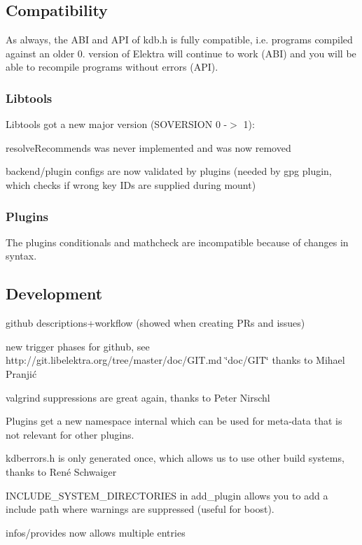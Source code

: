 \subsection*{Compatibility}

As always, the A\+B\+I and A\+P\+I of kdb.\+h is fully compatible, i.\+e. programs compiled against an older 0. version of Elektra will continue to work (A\+B\+I) and you will be able to recompile programs without errors (A\+P\+I).

\subsubsection*{Libtools}

Libtools got a new major version (S\+O\+V\+E\+R\+S\+I\+O\+N 0 -\/$>$ 1)\+:


\begin{DoxyItemize}
\item resolve\+Recommends was never implemented and was now removed
\item backend/plugin configs are now validated by plugins (needed by gpg plugin, which checks if wrong key I\+Ds are supplied during mount)
\end{DoxyItemize}

\subsubsection*{Plugins}

The plugins conditionals and mathcheck are incompatible because of changes in syntax.

\subsection*{Development}


\begin{DoxyItemize}
\item github descriptions+workflow (showed when creating P\+Rs and issues)
\item new trigger phases for github, see http\+://git.libelektra.\+org/tree/master/doc/\+G\+I\+T.md \char`\"{}doc/\+G\+I\+T\char`\"{} thanks to Mihael Pranjić
\item valgrind suppressions are great again, thanks to Peter Nirschl
\item Plugins get a new namespace {\ttfamily internal} which can be used for meta-\/data that is not relevant for other plugins.
\item kdberrors.\+h is only generated once, which allows us to use other build systems, thanks to René Schwaiger
\item {\ttfamily I\+N\+C\+L\+U\+D\+E\+\_\+\+S\+Y\+S\+T\+E\+M\+\_\+\+D\+I\+R\+E\+C\+T\+O\+R\+I\+E\+S} in add\+\_\+plugin allows you to add a include path where warnings are suppressed (useful for boost).
\item {\ttfamily infos/provides} now allows multiple entries
\end{DoxyItemize}

